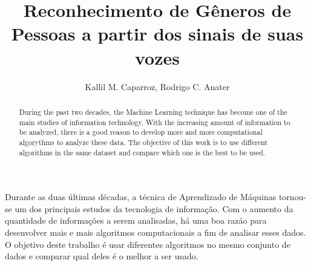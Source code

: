 \documentclass[
12pt,				%
openright,			%
twoside,			%
a4paper,			%
sumario=tradicional, %
hidelinks,          %
num,				%
bibjustif,			%
brackets,			%
english,			%
brazil				%
]{article}       %
\title{Reconhecimento de Gêneros de Pessoas a partir dos sinais de suas vozes}
\author{Kallil M. Caparroz\inst{1}, Rodrigo C. Anater\inst{2} }
\begin{document}
 

  \maketitle

\begin{abstract} 	
 	During the past two decades, the Machine Learning technique has become one of the main studies of information technology. With the increasing amount of information to be analyzed, there is a good reason to develop more and more computational algorythms to analyze these data. The objective of this work is to use different algorithms in the same dataset and compare which one is the best to be used.
\end{abstract}
     
\begin{resumo} 
 	Durante as duas últimas décadas, a técnica de Aprendizado de Máquinas tornou-se um dos principais estudos da tecnologia de informação. Com o aumento da quantidade de informações a serem analisadas, há uma boa razão para desenvolver mais e mais algoritmos computacionais a fim de analisar esses dados. O objetivo deste trabalho é usar diferentes algoritmos no mesmo conjunto de dados e comparar qual deles é o melhor a ser usado.   
\end{resumo}










\end{document}
